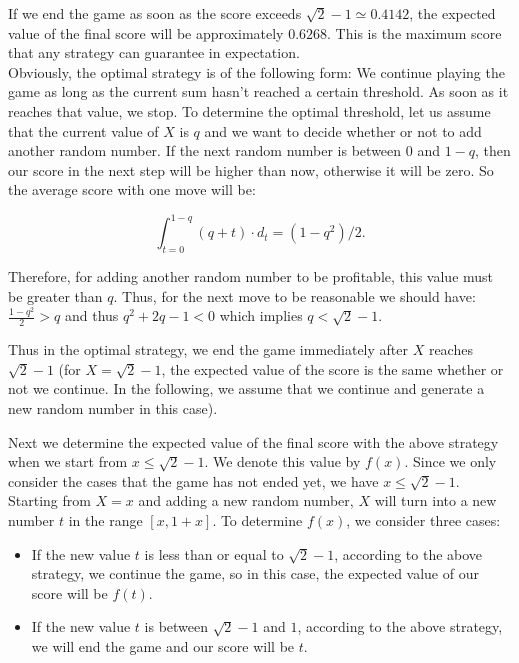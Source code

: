\begin{solution}
If we end the game as soon as the score exceeds $\sqrt{2}-1 \simeq 0.4142$, the expected value of the final score will be approximately $0.6268$. This is the maximum score that any strategy can guarantee in expectation.\\[0.29cm]

Obviously, the optimal strategy is of the following form: We continue playing the game as long as the current sum hasn't reached a certain threshold. As soon as it reaches that value, we stop. To determine the optimal threshold, let us assume that  the current value of $X$ is $q$ and we want to decide whether or not to add another random number. If the next random number is between 0 and $1-q$, then our score in the next step will be higher than now, otherwise it will be zero. So the average score with one move will be:

$$\int_{t=0}^{1-q} (q+t)\cdot d_t = (1-q^2)/2.$$

Therefore, for adding another random number to be profitable, this value must be greater than $q$. Thus, for the next move to be reasonable we should have: $\frac{1-q^2}{2} > q$ and thus $q^2+2q-1 < 0$ which implies $q < \sqrt{2}-1$.

	Thus in the optimal strategy, we end the game immediately after $X$ reaches $\sqrt{2}-1$ (for $X = \sqrt{2}-1$, the expected value of the score is the same whether or not we continue. In the following, we assume that we continue and generate a new random number in this case).

Next we determine the expected value of the final score with the above strategy when we start from $x \leq \sqrt{2}-1$. We denote this value by $f(x)$. Since we only consider the cases that the game has not ended yet, we have $x \leq \sqrt{2}-1$. Starting from $X = x$ and adding a new random number, $X$ will turn into a new number $t$ in the range $[x, 1+x]$. To determine $f(x)$, we consider three cases:

\begin{itemize}
\item If the new value $t$ is less than or equal to $\sqrt{2}-1$, according to the above strategy, we continue the game, so in this case, the expected value of our score will be $f(t)$.

\item If the new value $t$ is between $\sqrt{2}-1$ and $1$, according to the above strategy, we will end the game and our score will be $t$.


\end{itemize}
\end{solution}
